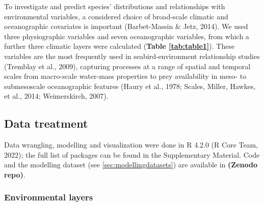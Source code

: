 \documentclass{article}
\begin{document}
\begin{linenumbers}
To investigate and predict species' distributions and relationships with environmental variables, a considered choice of broad-scale climatic and oceanographic covariates is important (Barbet-Massin \& Jetz, 2014). We used three physiographic variables and seven oceanographic variables, from which a further three climatic layers were calculated (\textbf{Table \ref{tab:table1}}). These variables are the most frequently used in seabird-environment relationship studies (Tremblay et al., 2009), capturing processes at a range of spatial and temporal scales from macro-scale water-mass properties to prey availability in meso- to submesoscale oceanographic features (Haury et al., 1978; Scales, Miller, Hawkes, et al., 2014; Weimerskirch, 2007).

\hypertarget{data-treatment}{%
\subsection{Data treatment}\label{data-treatment}}

Data wrangling, modelling and visualization were done in R 4.2.0 (R Core Team, 2022); the full list of packages can be found in the Supplementary Material. Code and the modelling dataset (see \ref{sec:modellingdatasets}) are available in \textbf{(Zenodo repo)}.

\hypertarget{environmental-layers}{%
\subsubsection{Environmental layers}\label{environmental-layers}}


\end{linenumbers}
\end{document}
